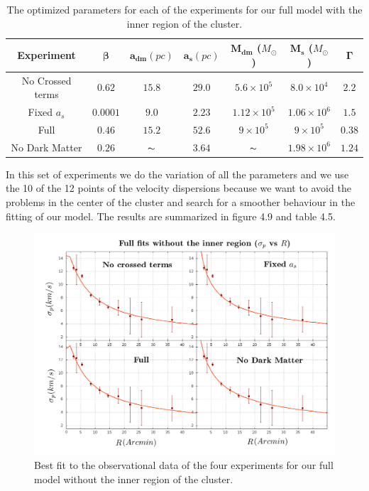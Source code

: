\begin{table}[H]
\begin{center}
\begin{tabular}{| c | c | c | c | c | c | c| }
    \hline
    \textbf{Experiment} & $\mathbf{\beta}$ & $\mathbf{a_{dm}} (pc)$ & $\mathbf{a_{s}} (pc)$ & $\mathbf{M_{dm}}$ ($M_{\odot}$) & $\mathbf{M_{s}}$ ($M_{\odot}$) & $\mathbf{\Gamma}$\\ \hline
	No Crossed terms & $0.62$ &	$15.8$ &	$29.0$ &	$5.6 \times 10^{5}$ &	$8.0 \times 10^{4}$ &	$2.2$\\ \hline
	Fixed $a_s$ &	$0.0001$ &	$9.0$ &	$2.23$ &	$1.12 \times 10^{5}$ &	$1.06 \times 10 ^{6}$ &	$1.5$\\ \hline
	Full &	$0.46$ &	$15.2$ &	$52.6$ &	$9 \times 10^{5}$ &	$9 \times 10^{5}$ &	$0.38$\\ \hline
	No Dark Matter &	$0.26$ & $\thicksim$	& $3.64$  & $\thicksim$ & $  1.98 \times 10^{6}$ & 	$1.24$\\
    \hline
  \end{tabular} 
\caption[Optimized parameters for our full model with the inner region.]{The optimized parameters for each of the experiments for our full model with the inner region of the cluster.}
\end{center}
\end{table}

In this set of experiments we do the variation of all the parameters and we use the 10 of the 12 points of the velocity dispersions because we want to avoid the problems in the center of the cluster and search for a smoother behaviour in the fitting of our model. The results are summarized in figure 4.9 and table 4.5.

\begin{figure}[H]
\centering
\includegraphics[width=15cm]{images/all_params_refinado_10.png}
\caption[Best fit of the full model without the inner region]{Best fit to the observational data of the four experiments for our full model without the inner region of the cluster.}
\end{figure}

